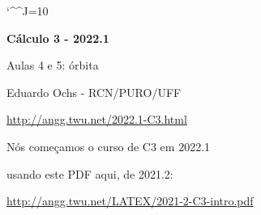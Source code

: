 \documentclass[oneside,12pt]{article}
\begin{document}
\catcode`\^^J=10
\pu
\def\pictgridstyle{\color{GrayPale}\linethickness{0.3pt}}
\def\pictaxesstyle{\linethickness{0.5pt}}
\celllower=2.5pt


\def\u#1{\par{\footnotesize \url{#1}}}

\def\drafturl{http://angg.twu.net/LATEX/2022-1-C3.pdf}
\def\drafturl{http://angg.twu.net/2022.1-C3.html}
\def\draftfooter{\tiny \href{\drafturl}{\jobname{}} \ColorBrown{\shorttoday{} \hours}}



%

\thispagestyle{empty}

\begin{center}

\vspace*{1.2cm}

{\bf \Large Cálculo 3 - 2022.1}

\bsk

Aulas 4 e 5: órbita

\bsk

Eduardo Ochs - RCN/PURO/UFF

\url{http://angg.twu.net/2022.1-C3.html}

\end{center}

\newpage

Nós começamos o curso de C3 em 2022.1

usando este PDF aqui, de 2021.2:

\ssk

{\footnotesize

\url{http://angg.twu.net/LATEX/2021-2-C3-intro.pdf}

}
\end{document}
